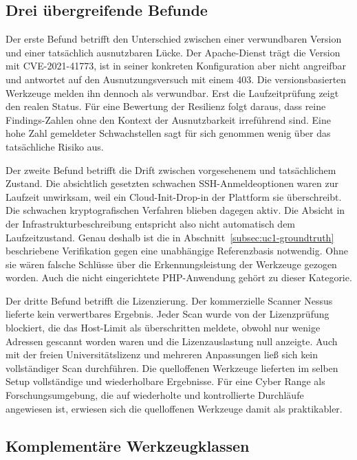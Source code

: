 \subsection{Drei übergreifende Befunde}
\label{subsec:uc1-befunde}

Der erste Befund betrifft den Unterschied zwischen einer verwundbaren Version und einer tatsächlich
ausnutzbaren Lücke. Der Apache-Dienst trägt die Version mit CVE-2021-41773, ist in seiner konkreten
Konfiguration aber nicht angreifbar und antwortet auf den Ausnutzungsversuch mit einem 403. Die
versionsbasierten Werkzeuge melden ihn dennoch als verwundbar. Erst die Laufzeitprüfung zeigt den
realen Status. Für eine Bewertung der Resilienz folgt daraus, dass reine Findings-Zahlen ohne den
Kontext der Ausnutzbarkeit irreführend sind. Eine hohe Zahl gemeldeter Schwachstellen sagt für sich
genommen wenig über das tatsächliche Risiko aus.

Der zweite Befund betrifft die Drift zwischen vorgesehenem und tatsächlichem Zustand. Die absichtlich
gesetzten schwachen SSH-Anmeldeoptionen waren zur Laufzeit unwirksam, weil ein Cloud-Init-Drop-in der
Plattform sie überschreibt. Die schwachen kryptografischen Verfahren blieben dagegen aktiv. Die
Absicht in der Infrastrukturbeschreibung entspricht also nicht automatisch dem Laufzeitzustand. Genau
deshalb ist die in Abschnitt~\ref{subsec:uc1-groundtruth} beschriebene Verifikation gegen eine
unabhängige Referenzbasis notwendig. Ohne sie wären falsche Schlüsse über die Erkennungsleistung der
Werkzeuge gezogen worden. Auch die nicht eingerichtete PHP-Anwendung gehört zu dieser Kategorie.

Der dritte Befund betrifft die Lizenzierung. Der kommerzielle Scanner Nessus lieferte kein
verwertbares Ergebnis. Jeder Scan wurde von der Lizenzprüfung blockiert, die das Host-Limit als
überschritten meldete, obwohl nur wenige Adressen gescannt worden waren und die Lizenzauslastung null
anzeigte. Auch mit der freien Universitätslizenz und mehreren Anpassungen ließ sich kein vollständiger
Scan durchführen. Die quelloffenen Werkzeuge lieferten im selben Setup vollständige und wiederholbare
Ergebnisse. Für eine Cyber Range als Forschungsumgebung, die auf wiederholte und kontrollierte
Durchläufe angewiesen ist, erwiesen sich die quelloffenen Werkzeuge damit als praktikabler.

\subsection{Komplementäre Werkzeugklassen}
\label{subsec:uc1-komplementaritaet}

